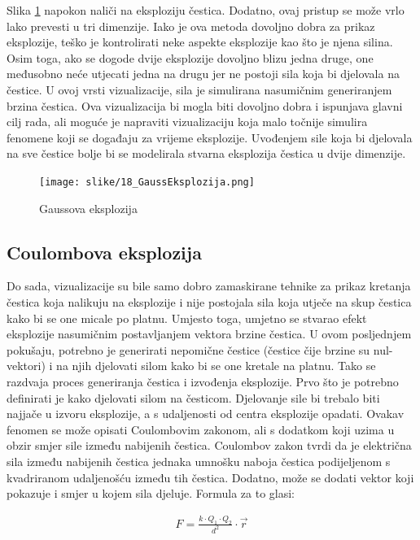 \documentclass{foi}
\begin{document}
Slika \ref{fig:GaussEksplozija} napokon naliči na eksploziju čestica. Dodatno, ovaj pristup se može vrlo lako prevesti u tri dimenzije. Iako je ova metoda dovoljno dobra za prikaz eksplozije, teško je kontrolirati neke aspekte eksplozije kao što je njena silina. Osim toga, ako se dogode dvije eksplozije dovoljno blizu jedna druge, one međusobno neće utjecati jedna na drugu jer ne postoji sila koja bi djelovala na čestice. U ovoj vrsti vizualizacije, sila je simulirana nasumičnim generiranjem brzina čestica. Ova vizualizacija bi mogla biti dovoljno dobra i ispunjava glavni cilj rada, ali moguće je napraviti vizualizaciju koja malo točnije simulira fenomene koji se događaju za vrijeme eksplozije. Uvođenjem sile koja bi djelovala na sve čestice bolje bi se modelirala stvarna eksplozija čestica u dvije dimenzije.

\begin{figure}[H]
    \centering
    \texttt{[image: slike/18\_GaussEksplozija.png]}
    \captionsetup{justification=centering}
    \caption{Gaussova eksplozija}
\label{fig:GaussEksplozija}
\end{figure}


\subsection{Coulombova eksplozija}
Do sada, vizualizacije su bile samo dobro zamaskirane tehnike za prikaz kretanja čestica koja nalikuju na eksplozije i nije postojala sila koja utječe na skup čestica kako bi se one micale po platnu. Umjesto toga, umjetno se stvarao efekt eksplozije nasumičnim postavljanjem vektora brzine čestica. U ovom posljednjem pokušaju, potrebno je generirati nepomične čestice (čestice čije brzine su nul-vektori) i na njih djelovati silom kako bi se one kretale na platnu. Tako se razdvaja proces generiranja čestica i izvođenja eksplozije. Prvo što je potrebno definirati je kako djelovati silom na česticom. Djelovanje sile bi trebalo biti najjače u izvoru eksplozije, a s udaljenosti od centra eksplozije opadati. Ovakav fenomen se može opisati Coulombovim zakonom, ali s dodatkom koji uzima u obzir smjer sile između nabijenih čestica. Coulombov zakon tvrdi da je električna sila između nabijenih čestica jednaka umnošku naboja čestica podijeljenom s kvadriranom udaljenošću između tih čestica. Dodatno, može se dodati vektor koji pokazuje i smjer u kojem sila djeluje. Formula za to glasi:

 \begin{align*}
F = \frac{k\cdot Q_1\cdot Q_2}{d^2}\cdot \Vec{r}
\end{align*}
\end{document}
